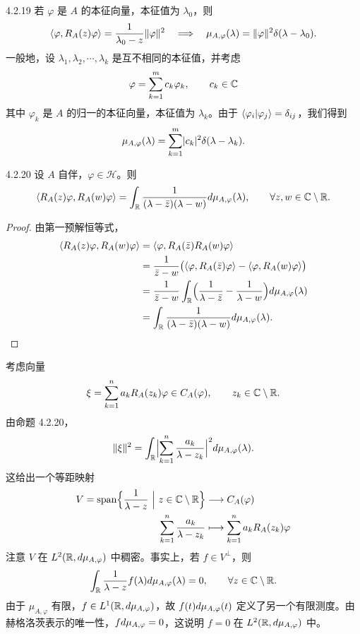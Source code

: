 \begin{example}{4.2.19}
  若 $\varphi$ 是 $A$ 的本征向量，本征值为 $\lambda_0$，则
  \[
  \left\langle \varphi,R_A(z)\varphi\right\rangle=\frac{1}{\lambda_0-z}\lVert \varphi\rVert^2
  \quad\Longrightarrow\quad
  \mu_{A,\varphi}(\lambda)=\lVert \varphi\rVert^2\delta(\lambda-\lambda_0).
  \]
  一般地，设 $\lambda_1,\lambda_2,\cdots,\lambda_k$ 是互不相同的本征值，并考虑
  \[
  \varphi=\sum_{k=1}^{m}c_k\varphi_k,\qquad c_k\in\mathbb{C}
  \]
  其中 $\varphi_k$ 是 $A$ 的归一的本征向量，本征值为 $\lambda_k$。由于 $\langle \varphi_i|\varphi_j\rangle=\delta_{ij}$，我们得到
  \[
  \mu_{A,\varphi}(\lambda)=\sum_{k=1}^{m}\lvert c_k\rvert^2\delta(\lambda-\lambda_k).
  \]
\end{example}

\begin{proposition}{4.2.20}
  设 $A$ 自伴，$\varphi\in\mathcal{H}$。则
  \[
  \left\langle R_A(z)\varphi,R_A(w)\varphi\right\rangle
  =\int_{\mathbb{R}}\frac{1}{(\lambda-\bar z)(\lambda-w)}d\mu_{A,\varphi}(\lambda),
  \qquad\forall z,w\in\mathbb{C}\setminus\mathbb{R}.
  \]
\end{proposition}

\begin{proof}
  由第一预解恒等式，
  \[
  \begin{aligned}
  \left\langle R_A(z)\varphi,R_A(w)\varphi\right\rangle
  &=\left\langle \varphi,R_A(\bar z)R_A(w)\varphi\right\rangle\\
  &=\frac{1}{\bar z-w}\bigl(\left\langle \varphi,R_A(\bar z)\varphi\right\rangle
  -\left\langle \varphi,R_A(w)\varphi\right\rangle\bigr)\\
  &=\frac{1}{\bar z-w}\int_{\mathbb{R}}\Bigl(\frac{1}{\lambda-\bar z}
  -\frac{1}{\lambda-w}\Bigr)d\mu_{A,\varphi}(\lambda)\\
  &=\int_{\mathbb{R}}\frac{1}{(\lambda-\bar z)(\lambda-w)}d\mu_{A,\varphi}(\lambda).
  \end{aligned}
  \]
\end{proof}

考虑向量
\[
\xi=\sum_{k=1}^{n}a_kR_A(z_k)\varphi\in C_A(\varphi),\qquad z_k\in\mathbb{C}\setminus\mathbb{R}.
\]
由命题 4.2.20，
\[
\lVert \xi\rVert^2=\int_{\mathbb{R}}\Bigl|\sum_{k=1}^{n}\frac{a_k}{\lambda-z_k}\Bigr|^2d\mu_{A,\varphi}(\lambda).
\]
这给出一个等距映射
\[
\begin{aligned}
V=\operatorname{span}\Bigl\{\frac{1}{\lambda-z}\ \Big|\ z\in\mathbb{C}\setminus\mathbb{R}\Bigr\}
&\longrightarrow C_A(\varphi)\\
\sum_{k=1}^{n}\frac{a_k}{\lambda-z_k}
&\longmapsto\sum_{k=1}^{n}a_kR_A(z_k)\varphi
\end{aligned}
\]
注意 $V$ 在 $L^2(\mathbb{R},d\mu_{A,\varphi})$ 中稠密。事实上，若 $f\in V^\perp$，则
\[
\int_{\mathbb{R}}\frac{1}{\lambda-z}f(\lambda)d\mu_{A,\varphi}(\lambda)=0,
\qquad\forall z\in\mathbb{C}\setminus\mathbb{R}.
\]
由于 $\mu_{A,\varphi}$ 有限，$f\in L^1(\mathbb{R},d\mu_{A,\varphi})$，故 $f(t)d\mu_{A,\varphi}(t)$ 定义了另一个有限测度。由赫格洛茨表示的唯一性，$fd\mu_{A,\varphi}=0$，这说明 $f=0$ 在 $L^2(\mathbb{R},d\mu_{A,\varphi})$ 中。

